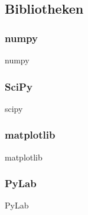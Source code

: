 \subsection{Bibliotheken}
\subsubsection{numpy}
\begin{frame}{numpy}
\end{frame}

\subsubsection{SciPy}
\begin{frame}{scipy}
\end{frame}

\subsubsection{matplotlib}
\begin{frame}{matplotlib}
\end{frame}

\subsubsection{PyLab}
\begin{frame}{PyLab}
\end{frame}

